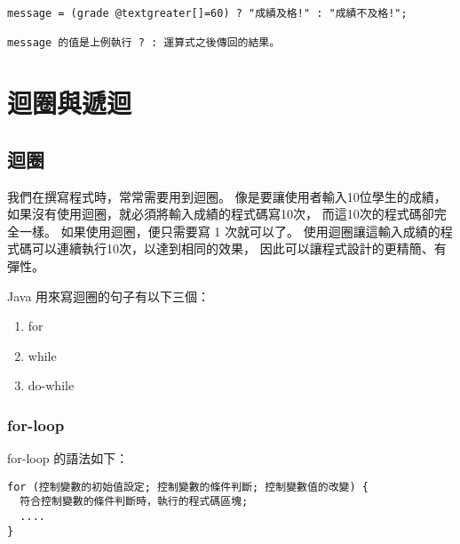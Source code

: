 \documentclass[a4paper,12pt,english]{sphinxmanual}
\begin{document}
\begin{Verbatim}[commandchars=@\[\]]
message = (grade @textgreater[]=60) ? "成績及格!" : "成績不及格!";

message 的值是上例執行 ? : 運算式之後傳回的結果。
\end{Verbatim}


\chapter{迴圈與遞迴}
\label{java_loop::doc}\label{java_loop:id1}

\section{迴圈}
\label{java_loop:id2}
我們在撰寫程式時，常常需要用到迴圈。
像是要讓使用者輸入10位學生的成績，
如果沒有使用迴圈，就必須將輸入成績的程式碼寫10次，
而這10次的程式碼卻完全一樣。
如果使用迴圈，便只需要寫 1 次就可以了。
使用迴圈讓這輸入成績的程式碼可以連續執行10次，以達到相同的效果，
因此可以讓程式設計的更精簡、有彈性。

Java 用來寫迴圈的句子有以下三個：
\begin{enumerate}
\item {} 
for

\item {} 
while

\item {} 
do-while

\end{enumerate}


\subsection{for-loop}
\label{java_loop:for-loop}
for-loop 的語法如下：

\begin{Verbatim}[commandchars=@\[\]]
for (控制變數的初始值設定; 控制變數的條件判斷; 控制變數值的改變) {
  符合控制變數的條件判斷時，執行的程式碼區塊;
  ....
}
\end{Verbatim}
\end{document}
